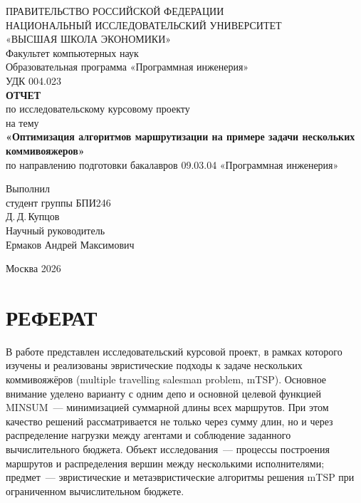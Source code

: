 \documentclass[14pt,a4paper]{extarticle}
\begin{document}
\begin{titlepage}
\begin{center}
ПРАВИТЕЛЬСТВО РОССИЙСКОЙ ФЕДЕРАЦИИ\\
НАЦИОНАЛЬНЫЙ ИССЛЕДОВАТЕЛЬСКИЙ УНИВЕРСИТЕТ\\
«ВЫСШАЯ ШКОЛА ЭКОНОМИКИ»\\
Факультет компьютерных наук\\
Образовательная программа «Программная инженерия»\\
\vspace{0.8cm}
УДК 004.023\\
\vspace{2.2cm}
\textbf{ОТЧЕТ}\\
по исследовательскому курсовому проекту\\
\vspace{0.8cm}
на тему\\
\textbf{«Оптимизация алгоритмов маршрутизации на примере задачи нескольких коммивояжеров»}\\
\vspace{0.8cm}
по направлению подготовки бакалавров 09.03.04 «Программная инженерия»
\end{center}

\vfill

\begin{flushright}
Выполнил\\
студент группы БПИ246\\
Д.\,Д.\,Купцов\\
\vspace{0.7cm}
Научный руководитель\\
Ермаков Андрей Максимович
\end{flushright}

\vfill

\begin{center}
Москва 2026
\end{center}
\end{titlepage}

\setcounter{page}{2}

\section*{РЕФЕРАТ}

В работе представлен исследовательский курсовой проект, в рамках которого изучены и реализованы эвристические подходы к задаче нескольких коммивояжёров (multiple travelling salesman problem, mTSP). Основное внимание уделено варианту с одним депо и основной целевой функцией MINSUM~--- минимизацией суммарной длины всех маршрутов. При этом качество решений рассматривается не только через сумму длин, но и через распределение нагрузки между агентами и соблюдение заданного вычислительного бюджета. Объект исследования~--- процессы построения маршрутов и распределения вершин между несколькими исполнителями; предмет~--- эвристические и метаэвристические алгоритмы решения mTSP при ограниченном вычислительном бюджете.
\end{document}
